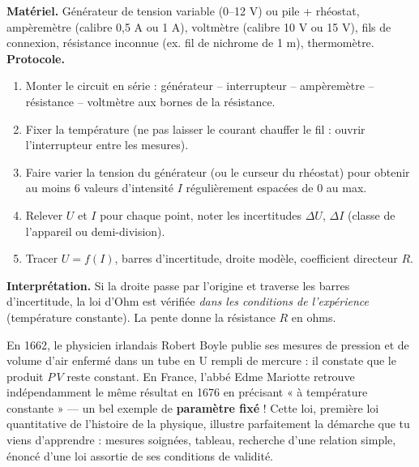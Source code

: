 \documentclass[11pt]{article}
\begin{document}
\begin{experience}
\textbf{Matériel.} Générateur de tension variable (0--12 V) ou pile + rhéostat, ampèremètre (calibre 0,5 A ou 1 A), voltmètre (calibre 10 V ou 15 V), fils de connexion, résistance inconnue (ex. fil de nichrome de 1 m), thermomètre.
\textbf{Protocole.}
\begin{enumerate}
\item Monter le circuit en série : générateur -- interrupteur -- ampèremètre -- résistance -- voltmètre aux bornes de la résistance.
\item Fixer la température (ne pas laisser le courant chauffer le fil : ouvrir l'interrupteur entre les mesures).
\item Faire varier la tension du générateur (ou le curseur du rhéostat) pour obtenir au moins 6 valeurs d'intensité $I$ régulièrement espacées de 0 au max.
\item Relever $U$ et $I$ pour chaque point, noter les incertitudes $\Delta U$, $\Delta I$ (classe de l'appareil ou demi-division).
\item Tracer $U = f(I)$, barres d'incertitude, droite modèle, coefficient directeur $R$.
\end{enumerate}
\textbf{Interprétation.} Si la droite passe par l'origine et traverse les barres d'incertitude, la loi d'Ohm est vérifiée \emph{dans les conditions de l'expérience} (température constante). La pente donne la résistance $R$ en ohms.
\end{experience}

\begin{savaistu}
En 1662, le physicien irlandais Robert Boyle publie ses mesures de pression et de volume d'air enfermé dans un tube en U rempli de mercure : il constate que le produit $P\,V$ reste constant. En France, l'abbé Edme Mariotte retrouve indépendamment le même résultat en 1676 en précisant « à température constante » — un bel exemple de \textbf{paramètre fixé} ! Cette loi, première loi quantitative de l'histoire de la physique, illustre parfaitement la démarche que tu viens d'apprendre : mesures soignées, tableau, recherche d'une relation simple, énoncé d'une loi assortie de ses conditions de validité.
\end{savaistu}
\end{document}
